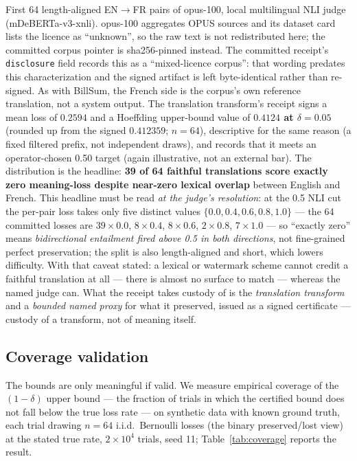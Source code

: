 \documentclass[11pt]{article}
\theoremstyle{definition}
\begin{document}
First 64 length-aligned EN$\to$FR pairs of opus-100, local multilingual NLI
judge (mDeBERTa-v3-xnli). opus-100 aggregates OPUS sources and its dataset card lists the licence as
``unknown'', so
the raw text is not redistributed here; the committed corpus pointer is
sha256-pinned instead. The committed receipt's \texttt{disclosure} field
records this as a ``mixed-licence corpus'': that wording predates this
characterization and the signed artifact is left byte-identical rather than
re-signed. As with BillSum, the French side is the corpus's own
reference translation, not a system output. The translation transform's
receipt signs a mean loss of $0.2594$ and a Hoeffding upper-bound value of
\textbf{$0.4124$ at $\delta=0.05$} (rounded up from the signed $0.412359$;
$n=64$), descriptive for the same reason (a fixed filtered prefix, not
independent draws), and records that it meets an operator-chosen 0.50 target
(again illustrative, not an external bar). The distribution is the headline: \textbf{39 of 64
faithful translations score exactly zero meaning-loss despite near-zero
lexical overlap} between English and French. This headline must be read
\emph{at the judge's resolution}: at the 0.5 NLI cut the per-pair loss takes
only five distinct values $\{0.0, 0.4, 0.6, 0.8, 1.0\}$ --- the 64 committed
losses are $39\times 0.0$, $8\times 0.4$, $8\times 0.6$, $2\times 0.8$,
$7\times 1.0$ --- so ``exactly zero'' means \emph{bidirectional entailment
fired above 0.5 in both directions}, not fine-grained perfect preservation;
the split is also length-aligned and short, which lowers difficulty. With
that caveat stated: a lexical or watermark scheme cannot credit a faithful
translation at all --- there is almost no surface to match --- whereas the
named judge can. What the receipt takes custody of is the \emph{translation
transform} and a \emph{bounded named proxy} for what it preserved, issued as
a signed certificate --- custody of a transform, not of meaning itself.

\subsection{Coverage validation}\label{sec:coverage}

The bounds are only meaningful if valid. We measure empirical coverage of
the $(1-\delta)$ upper bound --- the fraction of trials in which the
certified bound does not fall below the true loss rate --- on synthetic data
with known ground truth, each trial drawing $n=64$ i.i.d.\ Bernoulli losses
(the binary preserved/lost view) at the stated true rate, $2\times 10^{4}$
trials, seed 11; Table~\ref{tab:coverage} reports the result.
\end{document}
